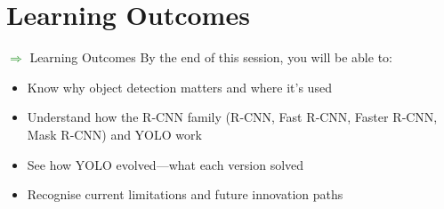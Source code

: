 \section{Learning Outcomes}
\begin{frame}[allowframebreaks]{\textcolor{green}{$\Rightarrow$} Learning Outcomes}
    By the end of this session, you will be able to:
        \begin{itemize}
            \item Know why object detection matters and where it's used
            \item Understand how the R‑CNN family (R‑CNN, Fast R‑CNN, Faster R‑CNN, Mask R‑CNN) and YOLO work
            \item See how YOLO evolved—what each version solved
            \item Recognise current limitations and future innovation paths
        \end{itemize}
\end{frame}